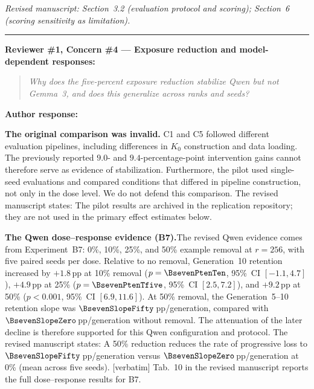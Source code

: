 \documentclass[11pt,a4paper]{article}
\newcommand{\newtext}[1]{#1}
\newcommand{\rconcern}[3]{%
  \bigskip\noindent\rule{\linewidth}{0.4pt}\par\medskip
  \noindent\textbf{\textcolor{rccolor}{#1 --- #2:}}\par
  \smallskip
  \begin{quote}\itshape\textcolor{rccolor}{#3}\end{quote}%
}
\newcommand{\arhead}[1]{\medskip\noindent\textbf{#1}\par\smallskip}
\newcommand{\newtext}[1]{\textcolor{chgcolor}{``#1''}}
\newcommand{\msloc}[1]{%
  \smallskip\noindent\textit{Revised manuscript: #1}\par%
}
\begin{document}
\msloc{Section~3.2 (evaluation protocol and scoring); Section~6
(scoring sensitivity as limitation).}

\rconcern{Reviewer \#1, Concern \#4}{Exposure reduction and model-dependent responses}{Why does the five-percent exposure reduction stabilize Qwen but not Gemma~3, and does this generalize across ranks and seeds?}

\arhead{Author response:}

\textbf{The original comparison was invalid.}
C1 and C5 followed different evaluation pipelines, including differences in $K_0$ construction and data loading. The previously reported $9.0$- and $9.4$-percentage-point intervention gains cannot therefore serve as evidence of stabilization. Furthermore, the pilot used single-seed evaluations and compared conditions that differed in pipeline construction, not only in the dose level. We do not defend this comparison. The revised manuscript states: \newtext{The pilot results are archived in the replication repository; they are not used in the primary effect estimates below.}

\medskip\noindent\textbf{The Qwen dose--response evidence (B7).}The revised Qwen evidence comes from Experiment~B7: 0\%, 10\%, 25\%, and 50\% example removal at $r=256$, with five paired seeds per dose. Relative to no removal, Generation~10 retention increased by $+1.8$\,pp at 10\% removal ($p=\BsevenPtenTen$, 95\%~CI $[-1.1,4.7]$), $+4.9$\,pp at 25\% ($p=\BsevenPtenTfive$, 95\%~CI $[2.5,7.2]$), and $+9.2$\,pp at 50\% ($p{<}0.001$, 95\%~CI $[6.9,11.6]$). At 50\% removal, the Generation~5--10 retention slope was $\BsevenSlopeFifty$\,pp/generation, compared with $\BsevenSlopeZero$\,pp/generation without removal. The attenuation of the later decline is therefore supported for this Qwen configuration and protocol. The revised manuscript states: \newtext{A 50\% reduction reduces the rate of progressive loss to $\BsevenSlopeFifty$\,pp/generation versus $\BsevenSlopeZero$\,pp/generation at 0\% (mean across five seeds).} [verbatim]
Tab.~10 in the revised manuscript reports the full dose--response results for B7.
\end{document}
